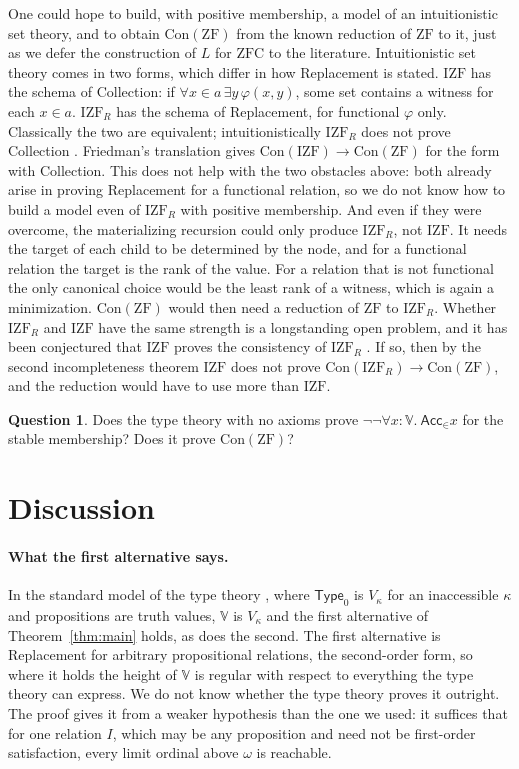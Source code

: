 \documentclass[10pt]{article}
\theoremstyle{definition}
\newtheorem{question}[theorem]{Question}
\theoremstyle{remark}
\newcommand{\Type}{\mathsf{Type}}
\newcommand{\ZF}{\mathrm{ZF}}
\newcommand{\ZFC}{\mathrm{ZFC}}
\newcommand{\Con}{\mathrm{Con}}
\newcommand{\Acc}{\mathsf{Acc}}
\newcommand{\V}{\mathbb{V}}
\begin{document}
One could hope to build, with positive membership, a model of an
intuitionistic set theory, and to obtain $\Con(\ZF)$ from the known
reduction of $\ZF$ to it, just as we defer the construction of $L$ for
$\ZFC$ to the literature. Intuitionistic set theory comes in two forms,
which differ in how Replacement is stated. $\mathrm{IZF}$ has the schema of
Collection: if $\forall x{\in}a\,\exists y\,\varphi(x,y)$, some set contains a witness for
each $x\in a$. $\mathrm{IZF}_R$ has the schema of Replacement, for functional
$\varphi$ only. Classically the two are equivalent; intuitionistically
$\mathrm{IZF}_R$ does not prove Collection \cite{friedmanscedrov85}. Friedman's translation
\cite{friedman73} gives $\Con(\mathrm{IZF})\to\Con(\ZF)$ for the form with
Collection. This does not help with the two obstacles above: both already
arise in proving Replacement for a functional relation, so we do not know
how to build a model even of $\mathrm{IZF}_R$ with positive membership. And
even if they were overcome, the materializing recursion could only
produce $\mathrm{IZF}_R$, not $\mathrm{IZF}$. It needs the target of each child to be
determined by the node, and for a functional relation the target is the
rank of the value. For a relation that is not functional the only
canonical choice would be the least rank of a witness, which is again a
minimization. $\Con(\ZF)$ would then need a reduction of $\ZF$ to
$\mathrm{IZF}_R$. Whether $\mathrm{IZF}_R$ and $\mathrm{IZF}$ have the same strength is a
longstanding open problem, and it has been conjectured that $\mathrm{IZF}$
proves the consistency of $\mathrm{IZF}_R$ \cite{rathjen05,moczydlowski08}. If
so, then by the second incompleteness theorem $\mathrm{IZF}$ does not prove
$\Con(\mathrm{IZF}_R)\to\Con(\ZF)$, and the reduction would have to use more
than $\mathrm{IZF}$.

\begin{question}
Does the type theory with no axioms prove $\neg\neg\forall x{:}\V.\ \Acc_\in x$ for the
stable membership? Does it prove $\Con(\ZF)$?
\end{question}

\section{Discussion}\label{sec:discussion}

\paragraph{What the first alternative says.}
In the standard model of the type theory \cite{werner97,leewerner11}, where $\Type_0$ is
$V_\kappa$ for an inaccessible $\kappa$ and propositions are truth values,
$\V$ is $V_\kappa$ and the first alternative of
Theorem~\ref{thm:main} holds, as does the second. The first alternative
is Replacement for arbitrary propositional relations, the second-order
form, so where it holds the height of $\V$ is regular with respect to
everything the type theory can express. We do not know whether the type
theory proves it outright. The proof gives it from a weaker
hypothesis than the one we used: it suffices that for one relation $I$,
which may be any proposition and need not be first-order satisfaction,
every limit ordinal above $\omega$ is reachable.
\end{document}
